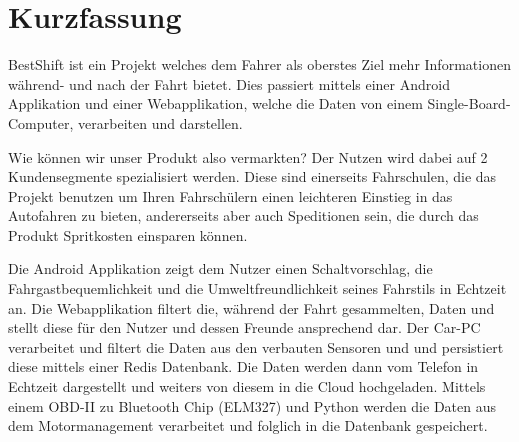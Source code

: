 \chapter{Kurzfassung}

BestShift ist ein Projekt welches dem Fahrer als oberstes Ziel mehr Informationen während- und nach der Fahrt bietet. 
Dies passiert mittels einer Android Applikation und einer Webapplikation, welche die Daten von einem Single-Board-Computer, verarbeiten und darstellen. 

\newline
Wie können wir unser Produkt also vermarkten?
Der Nutzen wird dabei auf 2 Kundensegmente spezialisiert werden.
Diese sind einerseits Fahrschulen, die das Projekt benutzen um Ihren Fahrschülern einen leichteren Einstieg in das Autofahren zu bieten, andererseits aber auch Speditionen sein, die durch das Produkt Spritkosten einsparen können.

\newline
Die Android Applikation zeigt dem Nutzer einen Schaltvorschlag, die Fahrgastbequemlichkeit und die Umweltfreundlichkeit seines Fahrstils in Echtzeit an. 
Die Webapplikation filtert die, während der Fahrt gesammelten, Daten  und stellt diese für den Nutzer und dessen Freunde ansprechend dar. 
Der Car-PC verarbeitet und filtert die Daten aus den verbauten Sensoren und  und persistiert diese mittels einer Redis Datenbank. Die Daten werden dann vom Telefon in Echtzeit dargestellt und weiters von diesem in die Cloud hochgeladen. Mittels einem OBD-II zu Bluetooth Chip (ELM327) und Python werden die Daten aus dem Motormanagement verarbeitet und folglich in die Datenbank gespeichert.